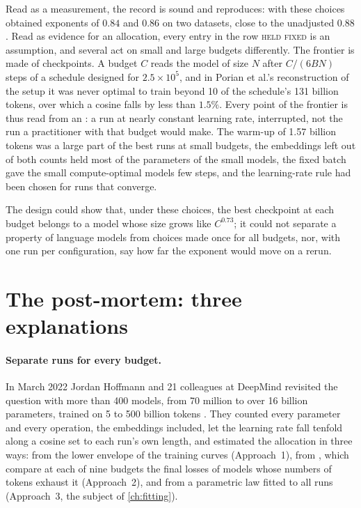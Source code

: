 \begin{refsection}
Read as a measurement, the record is sound and reproduces: with these choices \textcite{PorianEtAl2024} obtained exponents of $0.84$ and $0.86$ on two datasets, close to the unadjusted $0.88$. Read as evidence for an allocation, every entry in the row \textsc{held fixed} is an assumption, and several act on small and large budgets differently. The frontier is made of checkpoints. A budget $C$ reads the model of size $N$ after $C/(6BN)$ steps of a schedule designed for $2.5\times10^5$, and in Porian et al.'s reconstruction of the setup it was never optimal to train beyond 10 of the schedule's 131 billion tokens, over which a cosine falls by less than $1.5\%$. Every point of the frontier is thus read from an : a run at nearly constant learning rate, interrupted, not the run a practitioner with that budget would make. The warm-up of 1.57 billion tokens was a large part of the best runs at small budgets, the embeddings left out of both counts held most of the parameters of the small models, the fixed batch gave the small compute-optimal models few steps, and the learning-rate rule had been chosen for runs that converge.

The design could show that, under these choices, the best checkpoint at each budget belongs to a model whose size grows like $C^{0.73}$; it could not separate a property of language models from choices made once for all budgets, nor, with one run per configuration, say how far the exponent would move on a rerun.

\section{The post-mortem: three explanations}\label{sec:protocol:postmortem}

\paragraph{Separate runs for every budget.} In March 2022 Jordan Hoffmann and 21 colleagues at DeepMind revisited the question with more than 400 models, from 70 million to over 16 billion parameters, trained on 5 to 500 billion tokens \parencite{HoffmannEtAl2022}. They counted every parameter and every operation, the embeddings included, let the learning rate fall tenfold along a cosine set to each run's own length, and estimated the allocation in three ways: from the lower envelope of the training curves (Approach~1), from , which compare at each of nine budgets the final losses of models whose numbers of tokens exhaust it (Approach~2), and from a parametric law fitted to all runs (Approach~3, the subject of \cref{ch:fitting}).


\end{refsection}
